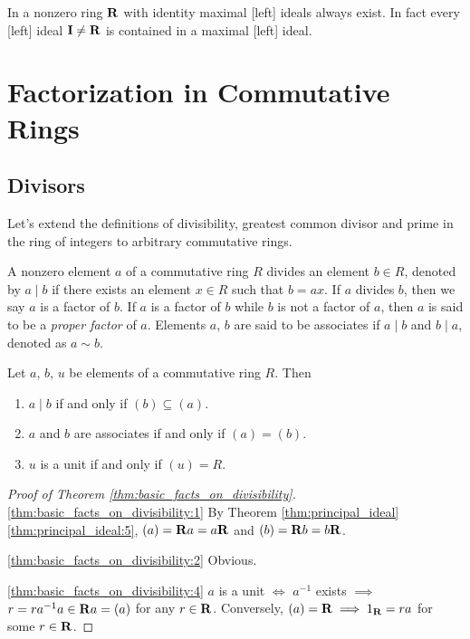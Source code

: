 \begin{thm}
\label{thm:rings:existence_of_maximal_ideals}
In a nonzero ring $\mathbf{R}$ with identity maximal [left] ideals always exist. 
In fact every [left] ideal $\mathbf{I} \neq \mathbf{R}$ is contained in a maximal [left] 
ideal. 
\end{thm}
\section{Factorization in Commutative Rings}
\subsection{Divisors}
Let's extend the definitions of divisibility, greatest common 
divisor and prime in the ring of integers to arbitrary commutative 
rings. 

\begin{defn}
A nonzero element $a$ of a commutative ring $R$ divides an element
$b \in R$, denoted by $a \mid b$ if there exists an element $x \in R$ such 
that $b = ax$. 
If $a$ divides $b$, then we say $a$ is a factor of $b$. 
If $a$ is a factor of $b$ while $b$ is not a factor of $a$, then $a$ is 
said to be a \emph{proper factor} of $a$. 
Elements $a$, $b$ are said to be associates if $a \mid b$ and $b \mid a$, 
denoted as $a \sim b$.
\end{defn}

\begin{thm}
\label{thm:basic_facts_on_divisibility}
Let $a$, $b$, $u$ be elements of a commutative ring $R$. Then 
\begin{enumerate}
    \item \label{thm:basic_facts_on_divisibility:1}
    $a \mid b$ if and only if $(b) \subseteq (a)$. 
    \item \label{thm:basic_facts_on_divisibility:2}
    $a$ and $b$ are associates if and only if $(a) = (b)$.
    
    \item \label{thm:basic_facts_on_divisibility:4}
    $u$ is a unit if and only if $(u) = R$.
    
\end{enumerate}
\end{thm}
\begin{proof}[Proof of Theorem \ref{thm:basic_facts_on_divisibility}]
\ref{thm:basic_facts_on_divisibility:1}
By Theorem \ref{thm:principal_ideal} \ref{thm:principal_ideal:5}, 
$(a) = \mathbf{R} a = a \mathbf{R}$ and $(b) = \mathbf{R} b = b \mathbf{R}$.

\ref{thm:basic_facts_on_divisibility:2} Obvious.

\ref{thm:basic_facts_on_divisibility:4}
$a$ is a unit $\iff$ $a^{-1}$ exists $\implies$ $r = r a^{-1} a 
\in \mathbf{R} a = (a)$ for any $r \in \mathbf{R}$. 
Conversely, $(a) = \mathbf{R} \implies 1_{\mathbf{R}} = ra$ for some $r \in \mathbf{R}$.  
\end{proof}

